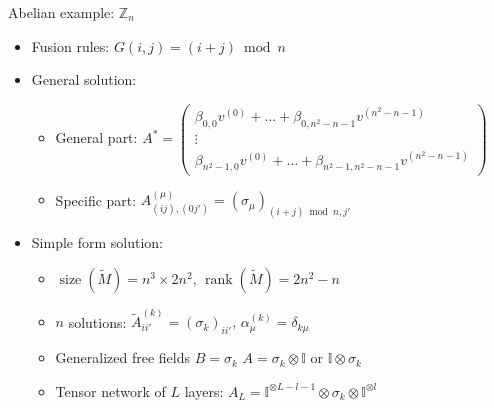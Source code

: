 \documentclass{fdubeamer}
\newcommand{\1}{\mathbb{1}}
\newcommand{\I}{\mathbb{I}}
\newcommand{\Z}{\mathbb{Z}}
\begin{document}
\begin{frame}{Abelian example: \texorpdfstring{$\Z_n$}{ℤₙ}}

\linespread{1.4}
\selectfont

\begin{itemize}
  \item Fusion rules: $G(i,j) = (i+j)\bmod n$
  \item General solution:

    \begin{itemize}
      \item General part:
        $
          A^* = \left( \begin{smallmatrix}
            \beta_{0,0} v^{(0)} + \dots + \beta_{0,n^2-n-1} v^{(n^2-n-1)} \\[0.5ex]
            \vdots \\
            \beta_{n^2-1,0} v^{(0)} + \dots + \beta_{n^2-1,n^2-n-1} v^{(n^2-n-1)}
          \end{smallmatrix} \right)
        $
      \item Specific part: $A^{(\mu)}_{(ij), (0j')} = (\sigma_\mu)_{(i+j)\bmod n, j'}$
    \end{itemize}

  \item Simple form solution:

    \begin{itemize}
      \item $\operatorname{size}(\tilde{M})=n^3\times2n^2, \, \operatorname{rank}(\tilde{M})=2n^2-n$
      \item $n$ solutions: $\tilde{A}^{(k)}_{ii'} = (\sigma_k)_{ii'}, \, \alpha^{(k)}_\mu = \delta_{k\mu}$
      \item Generalized free fields $B=\sigma_k$ \textrightarrow{} $A=\sigma_k\otimes\I$ or $\I\otimes\sigma_k$
      \item Tensor network of $L$ layers: $A_L = \I^{\otimes L-l-1} \otimes \sigma_k \otimes \I^{\otimes l}$
    \end{itemize}
\end{itemize}

\end{frame}
\end{document}
